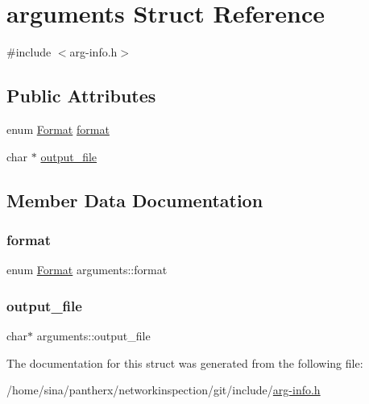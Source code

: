 \hypertarget{structarguments}{}\section{arguments Struct Reference}
\label{structarguments}


{\ttfamily \#include $<$arg-\/info.\+h$>$}

\subsection*{Public Attributes}
\begin{DoxyCompactItemize}
\item 
enum \hyperlink{arg-info_8h_ab4e88c89b3b7ea1735996cc4def22d58}{Format} \hyperlink{structarguments_af199740f9a4d285b640d5568d6372173}{format}
\item 
char $\ast$ \hyperlink{structarguments_ab967f3c192207878cfe15464aeafb551}{output\+\_\+file}
\end{DoxyCompactItemize}


\subsection{Member Data Documentation}
\mbox{\label{structarguments_af199740f9a4d285b640d5568d6372173}} 
\subsubsection{\texorpdfstring{format}{format}}
{\footnotesize\ttfamily enum \hyperlink{arg-info_8h_ab4e88c89b3b7ea1735996cc4def22d58}{Format} arguments\+::format}

\mbox{\label{structarguments_ab967f3c192207878cfe15464aeafb551}} 
\subsubsection{\texorpdfstring{output\+\_\+file}{output\_file}}
{\footnotesize\ttfamily char$\ast$ arguments\+::output\+\_\+file}



The documentation for this struct was generated from the following file\+:\begin{DoxyCompactItemize}
\item 
/home/sina/pantherx/networkinspection/git/include/\hyperlink{arg-info_8h}{arg-\/info.\+h}\end{DoxyCompactItemize}
